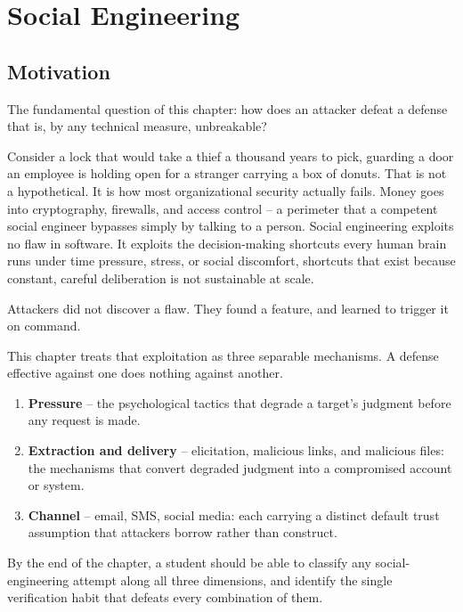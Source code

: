 \chapter{Social Engineering}
\label{ch:1.1}


\section{Motivation}

The fundamental question of this chapter: how does an attacker defeat a defense that is, by any
technical measure, unbreakable?

Consider a lock that would take a thief a thousand years to pick, guarding a door an employee is
holding open for a stranger carrying a box of donuts. That is not a hypothetical. It is how most
organizational security actually fails. Money goes into cryptography, firewalls, and access
control -- a perimeter that a competent social engineer bypasses simply by talking to a person.
Social engineering exploits no flaw in software. It exploits the decision-making shortcuts every
human brain runs under time pressure, stress, or social discomfort, shortcuts that exist because
constant, careful deliberation is not sustainable at scale.

Attackers did not discover a flaw. They found a feature, and learned to trigger it on command.

This chapter treats that exploitation as three separable mechanisms. A defense effective against
one does nothing against another.
\begin{enumerate}
\item \textbf{Pressure} -- the psychological tactics that degrade a target's judgment before any
request is made.
\item \textbf{Extraction and delivery} -- elicitation, malicious links, and malicious files: the
mechanisms that convert degraded judgment into a compromised account or system.
\item \textbf{Channel} -- email, SMS, social media: each carrying a distinct default trust
assumption that attackers borrow rather than construct.
\end{enumerate}
By the end of the chapter, a student should be able to classify any social-engineering attempt
along all three dimensions, and identify the single verification habit that defeats every
combination of them.

